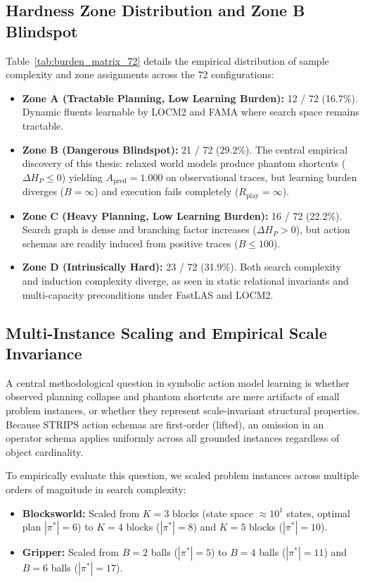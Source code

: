 \documentclass[11pt,a4paper]{article}
\theoremstyle{definition}
\begin{document}
\subsection{Hardness Zone Distribution and Zone B Blindspot}
Table~\ref{tab:burden_matrix_72} details the empirical distribution of sample complexity and zone assignments across the 72 configurations:
\begin{itemize}[leftmargin=*]
    \item \textbf{Zone A (Tractable Planning, Low Learning Burden):} 12 / 72 (16.7\%). Dynamic fluents learnable by LOCM2 and FAMA where search space remains tractable.
    \item \textbf{Zone B (Dangerous Blindspot):} 21 / 72 (29.2\%). The central empirical discovery of this thesis: relaxed world models produce phantom shortcuts ($\Delta H_P \le 0$) yielding $A_{\text{pred}} = 1.000$ on observational traces, but learning burden diverges ($B = \infty$) and execution fails completely ($R_{\text{play}} = \infty$).
    \item \textbf{Zone C (Heavy Planning, Low Learning Burden):} 16 / 72 (22.2\%). Search graph is dense and branching factor increases ($\Delta H_P > 0$), but action schemas are readily induced from positive traces ($B \le 100$).
    \item \textbf{Zone D (Intrinsically Hard):} 23 / 72 (31.9\%). Both search complexity and induction complexity diverge, as seen in static relational invariants and multi-capacity preconditions under FastLAS and LOCM2.
\end{itemize}



\subsection{Multi-Instance Scaling and Empirical Scale Invariance}
A central methodological question in symbolic action model learning is whether observed planning collapse and phantom shortcuts are mere artifacts of small problem instances, or whether they represent scale-invariant structural properties. Because STRIPS action schemas are first-order (lifted), an omission in an operator schema applies uniformly across all grounded instances regardless of object cardinality.

To empirically evaluate this question, we scaled problem instances across multiple orders of magnitude in search complexity:
\begin{itemize}[leftmargin=*]
    \item \textbf{Blocksworld:} Scaled from $K = 3$ blocks (state space $\approx 10^1$ states, optimal plan $|\pi^*| = 6$) to $K = 4$ blocks ($|\pi^*| = 8$) and $K = 5$ blocks ($|\pi^*| = 10$).
    \item \textbf{Gripper:} Scaled from $B = 2$ balls ($|\pi^*| = 5$) to $B = 4$ balls ($|\pi^*| = 11$) and $B = 6$ balls ($|\pi^*| = 17$).
\end{itemize}
\end{document}
